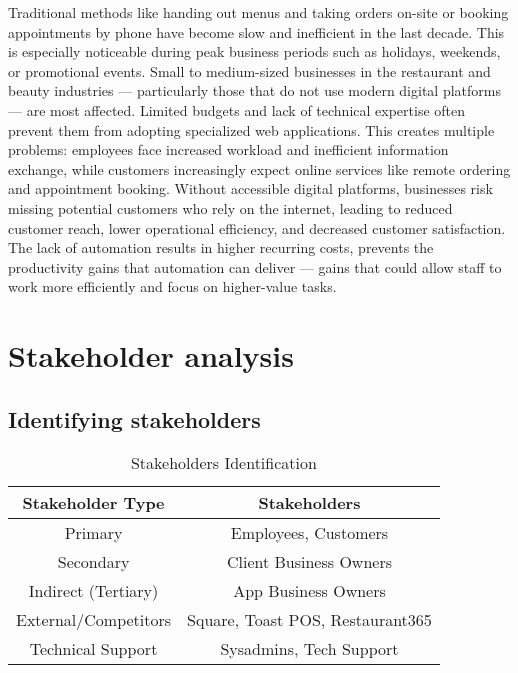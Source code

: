 \documentclass[]{VUMIFTemplateClass}
\begin{document}
% 


% 


% 



Traditional methods like handing out menus and taking orders on-site or booking appointments by phone have become slow and inefficient in the last decade. This is especially noticeable during peak business periods such as holidays, weekends, or promotional events. Small to medium-sized businesses in the restaurant and beauty industries — particularly those that do not use modern digital platforms — are most affected. Limited budgets and lack of technical expertise often prevent them from adopting specialized web applications. This creates multiple problems: employees face increased workload and inefficient information exchange, while customers increasingly expect online services like remote ordering and appointment booking. Without accessible digital platforms, 
businesses risk missing potential customers who rely on the internet, leading to reduced customer reach, lower operational efficiency, and decreased customer satisfaction. The lack of automation results in higher recurring costs, prevents the productivity gains that automation can deliver — gains that could allow staff to work more efficiently and focus on higher-value tasks.


\section{Stakeholder analysis}

\subsection{Identifying stakeholders}

\begin{table}[h]
  \centering
  \caption{Stakeholders Identification}
  \begin{tabular}{|c|c|}
    \hline
    Stakeholder Type    & Stakeholders \\ \hline
    Primary             & Employees, Customers \\ \hline
    Secondary           & Client Business Owners \\ \hline
    Indirect (Tertiary) & App Business Owners \\ \hline
    External/Competitors & Square, Toast POS, Restaurant365 \\ \hline
    Technical Support   & Sysadmins, Tech Support \\ \hline
  \end{tabular}
  \label{tab:stakeholders}
\end{table}
\end{document}
